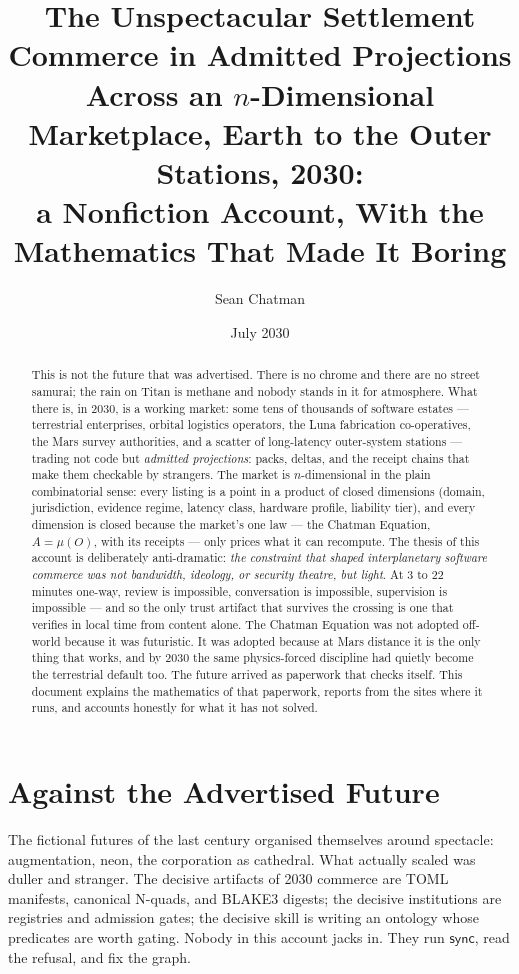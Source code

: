 \documentclass[11pt,a4paper]{report}
\title{\textbf{The Unspectacular Settlement}\\[0.6em]
\large Commerce in Admitted Projections Across an $n$-Dimensional
Marketplace, Earth to the Outer Stations, 2030:\\
a Nonfiction Account, With the Mathematics That Made It Boring}
\author{Sean Chatman}
\date{July 2030}
\theoremstyle{definition}
\theoremstyle{remark}
\newcommand{\sync}{\mathsf{sync}}
\newcommand{\mymu}{\mu}
\begin{document}
\maketitle

\begin{abstract}
\noindent
This is not the future that was advertised. There is no chrome and there
are no street samurai; the rain on Titan is methane and nobody stands in
it for atmosphere. What there is, in 2030, is a working market: some
tens of thousands of software estates --- terrestrial enterprises, orbital
logistics operators, the Luna fabrication co-operatives, the Mars survey
authorities, and a scatter of long-latency outer-system stations --- trading
not code but \emph{admitted projections}: packs, deltas, and the receipt
chains that make them checkable by strangers. The market is
$n$-dimensional in the plain combinatorial sense: every listing is a point
in a product of closed dimensions (domain, jurisdiction, evidence regime,
latency class, hardware profile, liability tier), and every dimension is
closed because the market's one law --- the Chatman Equation,
$A = \mymu(O)$, with its receipts --- only prices what it can recompute.
The thesis of this account is deliberately anti-dramatic: \emph{the
constraint that shaped interplanetary software commerce was not
bandwidth, ideology, or security theatre, but light}. At $3$ to $22$
minutes one-way, review is impossible, conversation is impossible,
supervision is impossible --- and so the only trust artifact that survives
the crossing is one that verifies in local time from content alone.
The Chatman Equation was not adopted off-world because it was futuristic.
It was adopted because at Mars distance it is the only thing that works,
and by 2030 the same physics-forced discipline had quietly become the
terrestrial default too. The future arrived as paperwork that checks
itself. This document explains the mathematics of that paperwork, reports
from the sites where it runs, and accounts honestly for what it has not
solved.
\end{abstract}

\tableofcontents

\chapter{Against the Advertised Future}

The fictional futures of the last century organised themselves around
spectacle: augmentation, neon, the corporation as cathedral. What actually
scaled was duller and stranger. The decisive artifacts of 2030 commerce
are TOML manifests, canonical N-quads, and BLAKE3 digests; the decisive
institutions are registries and admission gates; the decisive skill is
writing an ontology whose predicates are worth gating. Nobody in this
account jacks in. They run \(\sync\), read the refusal, and fix the graph.
\end{document}
